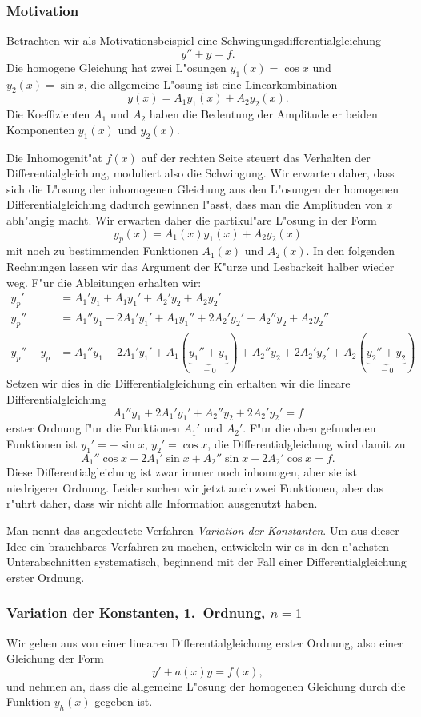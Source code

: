 \subsubsection{Motivation}
Betrachten wir als Motivationsbeispiel eine Schwingungsdifferentialgleichung
\[
y''+y=f.
\]
Die homogene Gleichung hat zwei L"osungen $y_1(x)=\cos x$ und $y_2(x)=\sin x$,
die allgemeine L"osung ist eine Linearkombination 
\[
y(x)=A_1y_1(x)+A_2y_2(x).
\]
Die Koeffizienten $A_1$ und $A_2$ haben die Bedeutung der Amplitude er
beiden Komponenten $y_1(x)$ und $y_2(x)$.

Die Inhomogenit"at $f(x)$ auf der rechten Seite steuert das Verhalten
der Differentialgleichung, moduliert also die Schwingung.
Wir erwarten daher, dass sich die L"osung der inhomogenen Gleichung
aus den L"osungen der homogenen Differentialgleichung dadurch gewinnen
l"asst, dass man die Amplituden von $x$ abh"angig macht.
Wir erwarten daher die partikul"are L"osung in der Form
\[
y_p(x)=A_1(x)y_1(x)+A_2y_2(x)
\]
mit noch zu bestimmenden Funktionen $A_1(x)$ und $A_2(x)$.
In den folgenden Rechnungen lassen wir das Argument der K"urze und Lesbarkeit
halber wieder weg.
F"ur die Ableitungen erhalten wir:
\begin{align*}
y_p'
&=
A_1'y_1+A_1y_1'+A_2'y_2+A_2y_2'
\\
y_p''
&=
A_1''y_1+2A_1'y_1'+A_1y_1''+2A_2'y_2'+A_2''y_2+A_2y_2''
\\
y_p''-y_p
&=
A_1''y_1+2A_1'y_1'+A_1(\underbrace{y_1''+y_1}_{=0})
+
A_2''y_2+2A_2'y_2'+A_2(\underbrace{y_2''+y_2}_{=0})
\end{align*}
Setzen wir dies in die Differentialgleichung ein erhalten wir die
lineare Differentialgleichung 
\[
A_1''y_1+2A_1'y_1' +A_2''y_2+2A_2'y_2'=f
\]
erster Ordnung f"ur die Funktionen $A_1'$ und $A_2'$.
F"ur die oben gefundenen Funktionen ist $y_1'=-\sin x$, $y_2'=\cos x$,
die Differentialgleichung wird damit zu
\[
A_1''\cos x -2A_1'\sin x +A_2''\sin x+2A_2'\cos x=f.
\]
Diese Differentialgleichung ist zwar immer noch inhomogen, aber sie
ist niedrigerer Ordnung.
Leider suchen wir jetzt auch zwei Funktionen, aber das r"uhrt daher, dass
wir nicht alle Information ausgenutzt haben.

Man nennt das angedeutete Verfahren {\em Variation der Konstanten}.
Um aus dieser Idee ein brauchbares Verfahren zu machen, entwickeln wir es
in den n"achsten Unterabschnitten systematisch, beginnend mit der Fall
einer Differentialgleichung erster Ordnung.

\subsubsection{Variation der Konstanten, 1.~Ordnung, $n=1$}
Wir gehen aus von einer linearen Differentialgleichung erster Ordnung,
also einer Gleichung der Form
\[
y' + a(x)y=f(x),
\]
und nehmen an, dass die allgemeine L"osung der homogenen Gleichung
durch die Funktion $y_h(x)$ gegeben ist.

